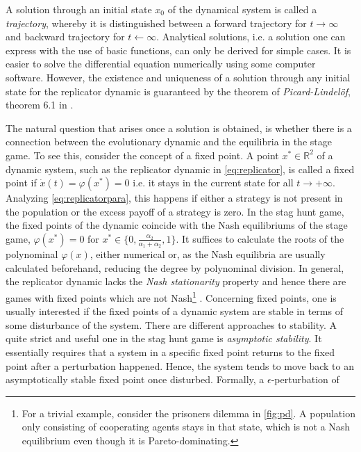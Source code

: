 \documentclass[11pt]{article}
\newcommand{\realnumb}{\mathbb{R}}
\begin{document}
A solution through an initial state $x_0$ of the dynamical system is called a 
\textit{trajectory}, whereby it is distinguished between a forward trajectory 
for $t \rightarrow \infty$ and backward trajectory for $t \leftarrow \infty$.
Analytical solutions, i.e. a solution one can express with the use of
basic functions, can only be derived for simple cases. 
It is easier to solve the differential equation numerically using some
computer software. 
However, the existence and uniqueness of a solution through
any initial state for the replicator dynamic is guaranteed by the theorem 
of \textit{Picard-Lindel\"of}, theorem 6.1 in 
\textcite[74]{weibull_evolutionary_1997}. 

The natural question that arises once a solution is obtained, is whether there 
is a connection between the evolutionary dynamic and the equilibria in the 
stage game. To see this, consider the concept of a fixed point.
A point $x^* \in \realnumb^2$ of a dynamic system, such as the replicator 
dynamic in \eqref{eq:replicator}, is called a fixed point
if $\dot{x}(t) = \varphi(x^*) = 0$ i.e. it stays in the current state for all 
$t \rightarrow + \infty $. 
Analyzing \eqref{eq:replicatorpara}, this happens if either a strategy
is not present in the population or the excess payoff of a strategy is zero. 
In the stag hunt game, the fixed points of the
dynamic coincide with the Nash equilibriums of the stage game, 
$\varphi(x^*) = 0$ for $x^* \in \{0,\frac{\alpha_2}{\alpha_1+\alpha_2},1\}$. 
It suffices to calculate the roots of the polynominal $\varphi(x)$, either
numerical or, as the Nash equilibria are usually calculated beforehand,
reducing the degree by polynominal division. In general, the replicator 
dynamic lacks the \textit{Nash stationarity} property and hence there are 
games with fixed points which are not Nash\footnote{For a trivial example, 
consider the prisoners dilemma in \ref{fig:pd}. A population only consisting of 
cooperating agents stays in that state, which is not a Nash equilibrium even 
though it is Pareto-dominating.} \parencite{sandholm_population_2010}.
Concerning fixed points, one is usually interested if the fixed points of 
a dynamic system are stable in terms of some disturbance of the system. 
There are different approaches to stability. A quite strict and useful one 
in the stag hunt game is \textit{asymptotic stability}. 
It essentially requires that a system in a specific fixed point returns 
to the fixed point after a perturbation happened.
Hence, the system tends to move back to an asymptotically stable fixed point
once disturbed. Formally, a $\epsilon$-perturbation of 
\end{document}
